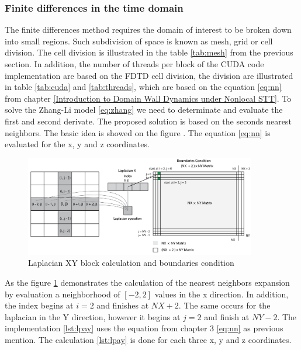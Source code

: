 \subsubsection{Finite differences in the time domain}

The finite differences method requires the domain of interest to be broken down into small regions. Such subdivision of space is known as mesh, grid or cell division. The cell division is illustrated in the table \ref{tab:mesh} from the previous section. In addition, the number of threads per block of the CUDA code implementation are based on the FDTD cell division, the division are illustrated in table \ref{tab:cuda} and \ref{tab:threads}, which are based on the equation \ref{eq:nn} from chapter \ref{Introduction to Domain Wall Dynamics under Nonlocal STT}. To solve the Zhang-Li model \ref{eq:zhang} we need to determinate and evaluate the first and second derivate. The proposed solution is based on the seconds nearest neighbors. The basic idea is showed on the figure \label{fig:laplacian}. The equation \ref{eq:nn} is evaluated for the x, y and z coordinates.

\begin{figure}[htbp]
	\centering
		\includegraphics[width=0.9\textwidth]{Figures/laplacian.png}
		\smallskip
	\caption[Laplacian block calculation]{Laplacian XY block calculation and boundaries condition}
	\label{fig:laplacian}
\end{figure}

As the figure \ref{fig:laplacian} demonstrates the calculation of the nearest neighbors expansion by evaluation a neighborhood of $[-2, 2]$ values in the x direction. In addition, the index begins at $i = 2$ and finishes at $NX + 2$. The same occurs for the laplacian in the Y direction, however it begins at $j = 2$ and finish at $NY -2$.  The implementation \ref{lst:lpay} uses the equation from chapter 3 \ref{eq:nn} as previous mention. The calculation \ref{lst:lpay} is done for each three x, y and z coordinates. 

